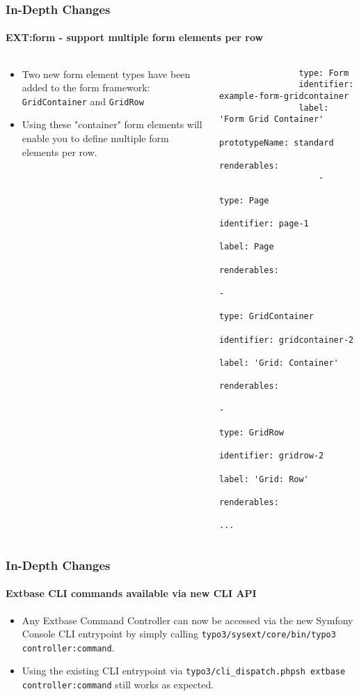 \begin{frame}[fragile]
	\frametitle{In-Depth Changes}
	\framesubtitle{EXT:form - support multiple form elements per row}

	\lstset{basicstyle=\tiny\ttfamily}

	\begin{columns}[T]
		\begin{column}{0.5\textwidth}
			\begin{itemize}
				\item Two new form element types have been added to the form framework: \texttt{GridContainer}
					and \texttt{GridRow}

				\item Using these "container" form elements will enable you to define multiple form elements per row.
			\end{itemize}
		\end{column}
		\begin{column}{0.5\textwidth}
			\begin{lstlisting}
				type: Form
				identifier: example-form-gridcontainer
				label: 'Form Grid Container'
				prototypeName: standard
				renderables:
				    -
				        type: Page
				        identifier: page-1
				        label: Page
				        renderables:
				            -
				                type: GridContainer
				                identifier: gridcontainer-2
				                label: 'Grid: Container'
				                renderables:
				                    -
				                        type: GridRow
				                        identifier: gridrow-2
				                        label: 'Grid: Row'
				                        renderables:
				                        ...
			\end{lstlisting}
		\end{column}
	\end{columns}

\end{frame}


\begin{frame}[fragile]
	\frametitle{In-Depth Changes}
	\framesubtitle{Extbase CLI commands available via new CLI API}

	\begin{itemize}
		\item Any Extbase Command Controller can now be accessed via the new Symfony Console
			CLI entrypoint by simply calling
			\texttt{typo3/sysext/core/bin/typo3 controller:command}.

		\item Using the existing CLI entrypoint via
			\texttt{typo3/cli\_dispatch.phpsh extbase controller:command} still works as expected.
	\end{itemize}

\end{frame}



